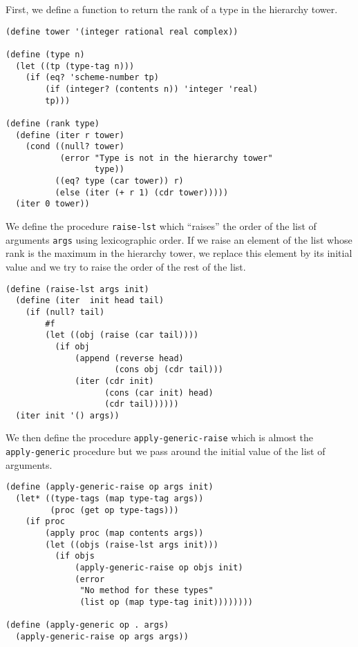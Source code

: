 \documentclass[a4paper,12pt]{article}
\begin{document}
First, we define a function to return the rank of a type in the
hierarchy tower.
\begin{lstlisting}
(define tower '(integer rational real complex))

(define (type n)
  (let ((tp (type-tag n)))
    (if (eq? 'scheme-number tp)
        (if (integer? (contents n)) 'integer 'real)
        tp)))

(define (rank type)
  (define (iter r tower)
    (cond ((null? tower)
           (error "Type is not in the hierarchy tower"
                  type))
          ((eq? type (car tower)) r)
          (else (iter (+ r 1) (cdr tower)))))
  (iter 0 tower))
\end{lstlisting}
We define the procedure \lstinline!raise-lst! which ``raises'' the
order of the list of arguments \lstinline!args! using lexicographic
order.  If we raise an element of the list whose rank is the maximum
in the hierarchy tower, we replace this element by its initial value
and we try to raise the order of the rest of the list.
\begin{lstlisting}
(define (raise-lst args init)
  (define (iter  init head tail)
    (if (null? tail)
        #f
        (let ((obj (raise (car tail))))
          (if obj
              (append (reverse head)
                      (cons obj (cdr tail)))
              (iter (cdr init)
                    (cons (car init) head)
                    (cdr tail))))))
  (iter init '() args))
\end{lstlisting}
We then define the procedure \lstinline!apply-generic-raise! which is
almost the \\
\lstinline!apply-generic! procedure but we pass around the
initial value of the list of arguments.
\begin{lstlisting}
(define (apply-generic-raise op args init)
  (let* ((type-tags (map type-tag args))
         (proc (get op type-tags)))
    (if proc
        (apply proc (map contents args))
        (let ((objs (raise-lst args init)))
          (if objs
              (apply-generic-raise op objs init)
              (error
               "No method for these types"
               (list op (map type-tag init))))))))

(define (apply-generic op . args)
  (apply-generic-raise op args args))
\end{lstlisting}
\end{document}
